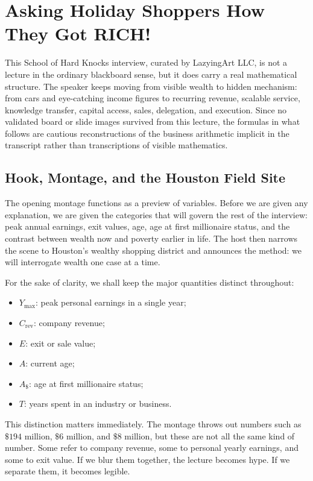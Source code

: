 \chapter{Asking Holiday Shoppers How They Got RICH!}

This School of Hard Knocks interview, curated by LazyingArt LLC, is not a lecture in the ordinary blackboard sense, but it does carry a real mathematical structure. The speaker keeps moving from visible wealth to hidden mechanism: from cars and eye-catching income figures to recurring revenue, scalable service, knowledge transfer, capital access, sales, delegation, and execution. Since no validated board or slide images survived from this lecture, the formulas in what follows are cautious reconstructions of the business arithmetic implicit in the transcript rather than transcriptions of visible mathematics.

\section{Hook, Montage, and the Houston Field Site}

The opening montage functions as a preview of variables. Before we are given any explanation, we are given the categories that will govern the rest of the interview: peak annual earnings, exit values, age, age at first millionaire status, and the contrast between wealth now and poverty earlier in life. The host then narrows the scene to Houston's wealthy shopping district and announces the method: we will interrogate wealth one case at a time.

For the sake of clarity, we shall keep the major quantities distinct throughout:
\begin{itemize}
\item \(Y_{\max}\): peak personal earnings in a single year;
\item \(C_{\text{rev}}\): company revenue;
\item \(E\): exit or sale value;
\item \(A\): current age;
\item \(A_{\$}\): age at first millionaire status;
\item \(T\): years spent in an industry or business.
\end{itemize}

This distinction matters immediately. The montage throws out numbers such as \(\$194\) million, \(\$6\) million, and \(\$8\) million, but these are not all the same kind of number. Some refer to company revenue, some to personal yearly earnings, and some to exit value. If we blur them together, the lecture becomes hype. If we separate them, it becomes legible.

